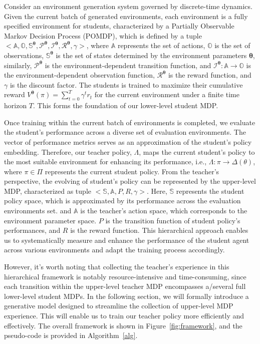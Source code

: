 \documentclass{article}
\newcommand\sA{\mathbb{A}}
\newcommand\sS{\mathbb{S}}
\newcommand\sO{\mathbb{O}}
\begin{document}
Consider an environment generation system governed by discrete-time dynamics. Given the current batch of generated environments, each environment is a fully specified environment for students, characterized by a Partially Observable Markov Decision Process (POMDP), which is defined by a tuple $<\sA,\sO,\sS^{\bm{\theta}},\mathcal{P}^{\bm{\theta}},\mathcal{I}^{\bm{\theta}},\mathcal{R}^{\bm{\theta}},\gamma>$, where $\sA$ represents the set of actions, $\sO$ is the set of observations, $\sS^{\bm{\theta}}$ is the set of states determined by the environment parameters $\bm{\theta}$, similarly, $\mathcal{P}^{\bm{\theta}}$ is the environment-dependent transition function, and $\mathcal{I}^{\bm{\theta}}:\sA \rightarrow \sO$ is the environment-dependent observation function, $\mathcal{R}^{\bm{\theta}}$ is the reward function, and $\gamma$ is the discount factor. The students is trained to maximize their cumulative reward $V^{\bm{\theta}}(\pi) = \sum_{t=0}^T \gamma^t r_t$ for the current environment under a finite time horizon $T$. This forms the foundation of our lower-level student MDP. 

Once training within the current batch of environments is completed, we evaluate the student's performance across a diverse set of evaluation environments. The vector of performance metrics serves as an approximation of the student's policy embedding. Therefore, our teacher policy, $\Lambda$, maps the current student's policy to the most suitable environment for enhancing its performance, i.e., $\Lambda: \pi \rightarrow \Delta(\mathbb{\theta})$, where $\pi \in \Pi$ represents the current student policy. From the teacher's perspective, the evolving of student's policy can be represented by the upper-level MDP, characterized as tuple $<\sS, \sA, P, R, \gamma>$. Here, $\sS$ represents the student policy space, which is approximated by its performance across the evaluation environments set. and $\sA$ is the teacher's action space, which corresponds to the environment parameter space. $P$ is the transition function of student policy's performances, and $R$ is the reward function.
This hierarchical approach enables us to systematically measure and enhance the performance of the student agent across various environments and adapt the training process accordingly.

However, it's worth noting that collecting the teacher's experience in this hierarchical framework is notably resource-intensive and time-consuming, since each transition within the upper-level teacher MDP encompasses a/several full lower-level student MDPs. In the following section, we will formally introduce a generative model designed to streamline the collection of upper-level MDP experience. This will enable us to train our teacher policy more efficiently and effectively. The overall framework is shown in Figure~\ref{fig:framework}, and the pseudo-code is provided in Algorithm~\ref{alg}.
\end{document}
